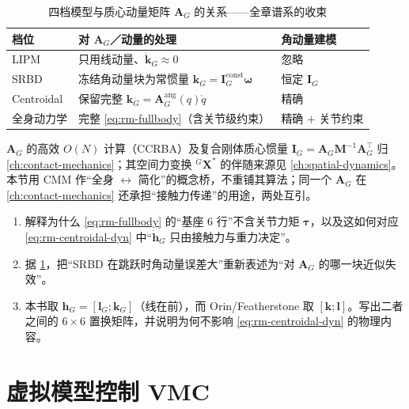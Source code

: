 \begin{table}[H]\centering\small
\caption{四档模型与质心动量矩阵 $\mathbf{A}_G$ 的关系——全章谱系的收束}
\label{tab:rm-cmm-bridge}
\begin{tabular}{lll}
\toprule
档位 & 对 $\mathbf{A}_G$／动量的处理 & 角动量建模 \\
\midrule
LIPM       & 只用线动量、$\dot{\mathbf{k}}_G\approx 0$ & 忽略 \\
SRBD       & 冻结角动量块为常惯量 $\mathbf{k}_G=\mathbf{I}_G^{\mathrm{const}}\boldsymbol{\omega}$ & 恒定 $\mathbf{I}_G$ \\
Centroidal & 保留完整 $\mathbf{k}_G=\mathbf{A}_G^{\mathrm{ang}}(q)\dot{q}$ & 精确 \\
全身动力学  & 完整 \cref{eq:rm-fullbody}（含关节级约束） & 精确 $+$ 关节约束 \\
\bottomrule
\end{tabular}
\end{table}

\begin{note}
$\mathbf{A}_G$ 的高效 $O(N)$ 计算（CCRBA）及复合刚体质心惯量 $\mathbf{I}_G=\mathbf{A}_G\mathbf{M}^{-1}\mathbf{A}_G^\top$ 归 \cref{ch:contact-mechanics}\cite{orin2013centroidal}；其空间力变换 ${}^{G}\!\mathbf{X}^*$ 的伴随来源见 \cref{ch:spatial-dynamics}。本节用 CMM 作“全身 $\leftrightarrow$ 简化”的概念桥，不重铺其算法；同一个 $\mathbf{A}_G$ 在 \cref{ch:contact-mechanics} 还承担“接触力传递”的用途，两处互引。
\end{note}

\begin{exercise}
\begin{enumerate}
  \item 解释为什么 \cref{eq:rm-fullbody} 的“基座 $6$ 行”不含关节力矩 $\boldsymbol{\tau}$，以及这如何对应 \cref{eq:rm-centroidal-dyn} 中“$\dot{\mathbf{h}}_G$ 只由接触力与重力决定”。
  \item 据 \cref{tab:rm-cmm-bridge}，把“SRBD 在跳跃时角动量误差大”重新表述为“对 $\mathbf{A}_G$ 的哪一块近似失效”。
  \item 本书取 $\mathbf{h}_G=[\mathbf{l}_G;\mathbf{k}_G]$（线在前），而 Orin/Featherstone 取 $[\mathbf{k};\mathbf{l}]$。写出二者之间的 $6\times 6$ 置换矩阵，并说明为何不影响 \cref{eq:rm-centroidal-dyn} 的物理内容。
\end{enumerate}
\end{exercise}

\section{虚拟模型控制 VMC}
\label{sec:rm-vmc}

